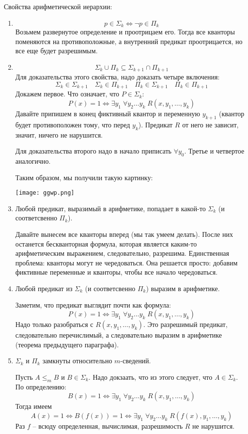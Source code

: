 Свойства арифметической иерархии: \begin{enumerate}
    \item \[p \in \Sigma_k \Leftrightarrow \lnot p \in \Pi_k\] Возьмем развернутое определение и проотрицаем его. Тогда все кванторы поменяются на противоположные, а внутренний предикат проотрицается, но все еще будет разрешимым.
    \item \[ \Sigma_k \cup \Pi_k \subseteq \Sigma_{k+1} \cap \Pi_{k+1} \] Для доказательства этого свойства, надо доказать четыре включения: \[ \Sigma_k \in \Sigma_{k+1} \quad \Sigma_k \in \Pi_{k + 1} \quad \Pi_k \in \Sigma_{k+1} \quad \Pi_k \in \Pi_{k+1} \] Докажем первое. Что означает, что $P \in \Sigma_k:$ \[ P(x) = 1 \Leftrightarrow \exists y_1 \; \forall y_2 \dots y_k \; R(x, y_1, \dots, y_k) \] Давайте припишем в конец фиктивный квантор и переменную $y_{k+1}$ (квантор будет противоположен тому, что перед $y_k$). Предикат $R$ от него не зависит, значит, ничего не нарушится.
    
    Для доказательства второго надо в начало приписать $\forall y_0$. Третье и четвертое аналогично.

    Таким образом, мы получили такую картинку: 

    \begin{center}
        \texttt{[image: ggwp.png]}
    \end{center}
    

    \item Любой предикат, выразимый в арифметике, попадает в какой-то $\Sigma_k$ (и соответсвенно $\Pi_k$).
    
    Давайте вынесем все кванторы вперед (мы так умеем делать). После них останется бескванторная формула, которая является каким-то арифметическим выражением, следовательно, разрешима. Единственная проблема: кванторы могут не чередоваться. Она решается просто: добавим фиктивные переменные и кванторы, чтобы все начало чередоваться.
    \item Любой предикат из $\Sigma_k$ (и соответсвенно $\Pi_k$) выразим в арифметике. 
    
    Заметим, что предикат выглядит почти как формула: \[ P(x) = 1 \Leftrightarrow \exists y_1 \; \forall y_2 \dots y_k \; R(x, y_1, \dots, y_k) \] Надо только разобраться с $R(x, y_1, \dots, y_k)$. Это разрешимый предикат, следовательно перечислимый, а следовательно выразим в арифметике (теорема предыдущего параграфа). 

    \item $\Sigma_k$ и $\Pi_k$ замкнуты относительно $m$-сведений.
    
    Пусть $A \leqslant_m B$ и $B \in \Sigma_k$. Надо докзаать, что из этого следует, что $A \in \Sigma_k$. По определению: \[ B(x) = 1 \Leftrightarrow \exists y_1 \; \forall y_2 \dots y_k \; R(x, y_1, \dots, y_k) \]
    Тогда имеем \[ A(x) = 1 \Leftrightarrow B(f(x)) = 1 \Leftrightarrow \exists y_1 \; \forall y_2 \dots y_k \; R(f(x), y_1, \dots, y_k) \] Раз $f$ -- всюду определенная, вычислимая, разрешимость $R$ не нарушится. 
\end{enumerate}

